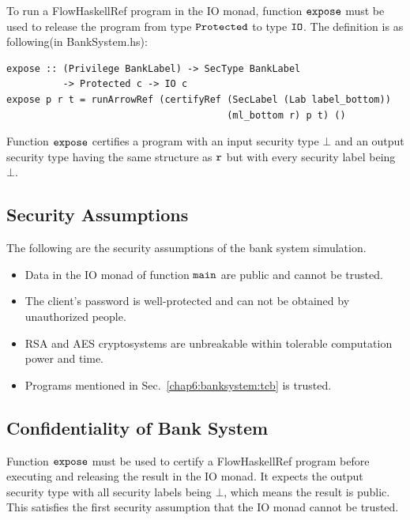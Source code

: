 \documentclass{report}
\newcommand{\co}[1]{$\cod{#1}$}
\begin{document}
To run a FlowHaskellRef program in the IO monad, function \co{expose} must be used to release the program from
type \co{Protected} to type \co{IO}.
The definition is as following(in BankSystem.hs):
\begin{Verbatim}[fontsize=\small]
expose :: (Privilege BankLabel) -> SecType BankLabel 
          -> Protected c -> IO c
expose p r t = runArrowRef (certifyRef (SecLabel (Lab label_bottom)) 
                                       (ml_bottom r) p t) ()
\end{Verbatim}
Function \co{expose} certifies a program with an input security type $\bot$ and an output security
type having the same structure as \co{r} but with every security label being $\bot$.

\subsection{Security Assumptions}
The following are the security assumptions of the bank system simulation.
\begin{itemize}
\item Data in the IO monad of function \co{main} are public and cannot be trusted.
\item The client's password is well-protected and can not be obtained by unauthorized people.
\item RSA and AES cryptosystems are unbreakable within tolerable computation power and time.
\item Programs mentioned in Sec.~\ref{chap6:banksystem:tcb} is trusted.
\end{itemize}

\subsection{Confidentiality of Bank System}
Function \co{expose} must be used to certify a FlowHaskellRef program before executing and releasing the 
result in the IO monad. It expects the output security
type with all security labels being $\bot$, which means the result is public. This satisfies the first 
security assumption that the IO monad cannot be trusted.
\end{document}
